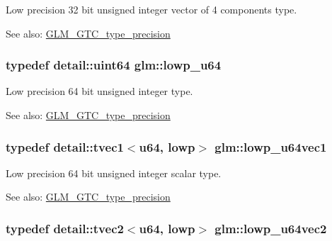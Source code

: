 Low precision 32 bit unsigned integer vector of 4 components type. \begin{Desc}
\item[See also:]\hyperlink{group__gtc__type__precision}{GLM\_\-GTC\_\-type\_\-precision} \end{Desc}
\hypertarget{group__gtc__type__precision_g61ed4c68a4cffb77cd63cc107119123a}{
\subsubsection[lowp\_\-u64]{\setlength{\rightskip}{0pt plus 5cm}typedef detail::uint64 {\bf glm::lowp\_\-u64}}}
\label{group__gtc__type__precision_g61ed4c68a4cffb77cd63cc107119123a}


Low precision 64 bit unsigned integer type. \begin{Desc}
\item[See also:]\hyperlink{group__gtc__type__precision}{GLM\_\-GTC\_\-type\_\-precision} \end{Desc}
\hypertarget{group__gtc__type__precision_gcd97dc5e92d0e2f6f6d62a5160508e2a}{
\subsubsection[lowp\_\-u64vec1]{\setlength{\rightskip}{0pt plus 5cm}typedef detail::tvec1$<$u64, lowp$>$ {\bf glm::lowp\_\-u64vec1}}}
\label{group__gtc__type__precision_gcd97dc5e92d0e2f6f6d62a5160508e2a}


Low precision 64 bit unsigned integer scalar type. \begin{Desc}
\item[See also:]\hyperlink{group__gtc__type__precision}{GLM\_\-GTC\_\-type\_\-precision} \end{Desc}
\hypertarget{group__gtc__type__precision_ge0e7d3ed32e8e79b4f6dd0c9baafcaea}{
\subsubsection[lowp\_\-u64vec2]{\setlength{\rightskip}{0pt plus 5cm}typedef detail::tvec2$<$u64, lowp$>$ {\bf glm::lowp\_\-u64vec2}}}
\label{group__gtc__type__precision_ge0e7d3ed32e8e79b4f6dd0c9baafcaea}


